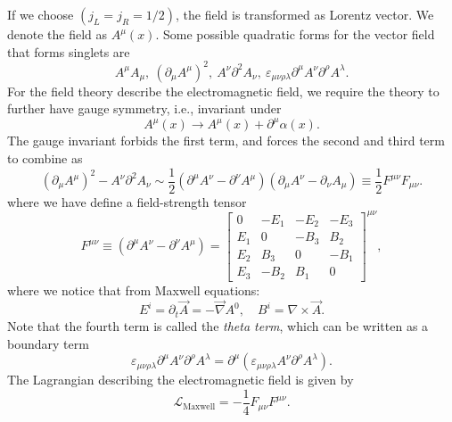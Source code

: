 \documentclass[aps,prb,superscriptaddress,nofootinbib]{revtex4}
\begin{document}
If we choose $(j_L=j_R=1/2)$, the field is transformed as Lorentz vector.
We denote the field as $A^\mu(x)$.
Some possible quadratic forms for the vector field that forms singlets are
\begin{equation}
	A^\mu A_\mu,\ (\partial_\mu A^\mu)^2,\ A^\nu \partial^2 A_\nu,\ 
	\varepsilon_{\mu\nu\rho\lambda} \partial^\mu A^\nu \partial^\rho A^\lambda.
\end{equation}
For the field theory describe the electromagnetic field, we require the theory to further have gauge symmetry, i.e., invariant under
\begin{equation}
	A^\mu(x) \rightarrow A^\mu(x) + \partial^\mu \alpha(x).
\end{equation}
The gauge invariant forbids the first term, and forces the second and third term to combine as
\begin{equation*}
	(\partial_\mu A^\mu)^2 - A^\nu \partial^2 A_\nu
	\sim \frac{1}{2}(\partial^\mu A^\nu - \partial^\nu A^\mu)(\partial_\mu A^\nu-\partial_\nu A_\mu)
	\equiv \frac{1}{2} F^{\mu\nu}F_{\mu\nu}.
\end{equation*}
where we have define a field-strength tensor
\begin{equation}
	F^{\mu\nu}\equiv (\partial^\mu A^\nu - \partial^\nu A^\mu)
	= \left[\begin{array}{cccc}
		0 & -E_1 & -E_2 & -E_3 \\
		E_1 & 0 & -B_3 & B_2 \\
		E_2 & B_3 & 0 & -B_1 \\
		E_3 & -B_2 & B_1 & 0
	\end{array} \right]^{\mu\nu},
\end{equation}
where we notice that from Maxwell equations:
\begin{equation}
	E^i = \partial_t \vec A = -\vec\nabla A^0, \quad B^i = \nabla \times \vec A.
\end{equation}
Note that the fourth term is called the \textit{theta term}, which can be written as a boundary term
\begin{equation}
	\varepsilon_{\mu\nu\rho\lambda} \partial^\mu A^\nu \partial^\rho A^\lambda
	= \partial^\mu (\varepsilon_{\mu\nu\rho\lambda} A^\nu \partial^\rho A^\lambda).
\end{equation}
The Lagrangian describing the electromagnetic field is given by
\begin{equation}
	\mathcal{L}_{\mathrm{Maxwell}} = -\frac{1}{4}F_{\mu\nu}F^{\mu\nu}.
\end{equation}
\end{document}
